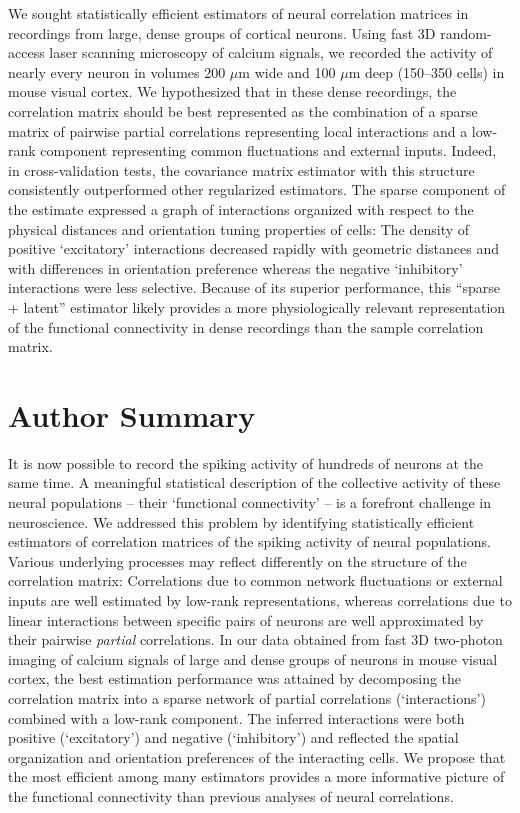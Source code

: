 \documentclass[10pt]{article}
\newcommand{\sq}[1]{\lq#1\rq}
\begin{document}
We sought statistically efficient estimators of neural correlation matrices in recordings from large, dense groups of cortical neurons.  Using fast 3D random-access laser scanning microscopy of calcium signals, we recorded the activity of nearly every neuron in volumes 200 $\mu$m wide and 100 $\mu$m deep (150--350 cells) in mouse visual cortex.  We hypothesized that in these dense recordings, the correlation matrix should be best represented as the combination of a sparse matrix of pairwise partial correlations representing local interactions and a low-rank component representing common fluctuations and external inputs.  Indeed, in cross-validation tests, the covariance matrix estimator with this structure consistently outperformed other regularized estimators. The sparse component of the estimate expressed a graph of interactions organized with respect to the physical distances and orientation tuning properties of cells: The density of positive \sq{excitatory} interactions decreased rapidly with geometric distances and with differences in orientation preference whereas the negative \sq{inhibitory} interactions were less selective.  Because of its superior performance, this ``sparse + latent'' estimator likely provides a more physiologically relevant representation of the functional connectivity in dense recordings than the sample correlation matrix.


\section*{Author Summary}

It is now possible to record the spiking activity of hundreds of neurons at the same time.  A meaningful statistical description of the collective activity of these neural populations -- their \sq{functional connectivity} -- is a forefront challenge in neuroscience.  We addressed this problem by identifying statistically efficient estimators of correlation matrices of the spiking activity of neural populations.  Various underlying processes may reflect differently on the structure of the correlation matrix:  Correlations due to common network fluctuations or external inputs are well estimated by low-rank representations, whereas correlations due to linear interactions between specific pairs of neurons are well approximated by their pairwise \emph{partial} correlations.  In our data obtained from fast 3D two-photon imaging of calcium signals of large and dense groups of neurons in mouse visual cortex, the best estimation performance was attained by decomposing the correlation matrix into a sparse network of partial correlations (\sq{interactions}) combined with a low-rank component. The inferred interactions were both positive (\sq{excitatory}) and negative (\sq{inhibitory}) and reflected the spatial organization and orientation preferences of the interacting cells.  We propose that  the most efficient among many estimators provides a more informative picture of the functional connectivity than previous analyses of neural correlations.
\end{document}
